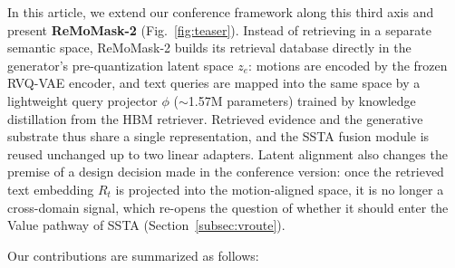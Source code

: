 \documentclass[10pt,journal,compsoc]{IEEEtran}
\begin{document}
In this article, we extend our conference framework along this third axis and present \textbf{ReMoMask-2} (Fig.~\ref{fig:teaser}). Instead of retrieving in a separate semantic space, ReMoMask-2 builds its retrieval database directly in the generator's pre-quantization latent space $z_e$: motions are encoded by the frozen RVQ-VAE encoder, and text queries are mapped into the same space by a lightweight query projector $\phi$ ($\sim$1.57M parameters) trained by knowledge distillation from the HBM retriever. Retrieved evidence and the generative substrate thus share a single representation, and the SSTA fusion module is reused unchanged up to two linear adapters. Latent alignment also changes the premise of a design decision made in the conference version: once the retrieved text embedding $R_t$ is projected into the motion-aligned space, it is no longer a cross-domain signal, which re-opens the question of whether it should enter the Value pathway of SSTA (Section~\ref{subsec:vroute}).

Our contributions are summarized as follows:
\end{document}
